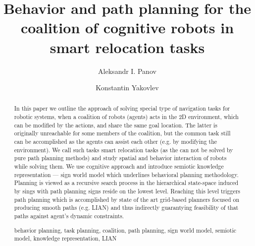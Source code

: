 \documentclass[runningheads,a4paper]{llncs}
\newcommand{\keywords}[1]{\par\addvspace\baselineskip
\noindent\keywordname\enspace\ignorespaces#1}
\begin{document}
\mainmatter  %

\title{Behavior and path planning for the coalition of cognitive robots in smart relocation tasks}


\author{Aleksandr I. Panov \and Konstantin Yakovlev}
%


\maketitle


\begin{abstract}
In this paper we outline the approach of solving special type of navigation tasks for robotic systems, when a coalition of robots (agents) acts in the 2D environment, which can be modified by the actions, and share the same goal location. The latter is originally unreachable for some members of the coalition, but the common task still can be accomplished as the agents can assist each other (e.g. by modifying the environment). We call such tasks smart relocation tasks (as the can not be solved by pure path planning methods) and study spatial and behavior interaction of robots while solving them. We use cognitive approach and introduce semiotic knowledge representation --- sign world model which underlines behavioral planning methodology. Planning is viewed as a recursive search process in the hierarchical state-space induced by sings with path planning signs reside on the lowest level. Reaching this level triggers path planning which is accomplished by state of the art grid-based planners focused on producing smooth paths (e.g. LIAN) and thus indirectly guarantying feasibility of that paths against agent's dynamic constraints.
\keywords{behavior planning, task planning, coalition, path planning, sign world model, semiotic model, knowledge representation, LIAN}
\end{abstract}
\end{document}
